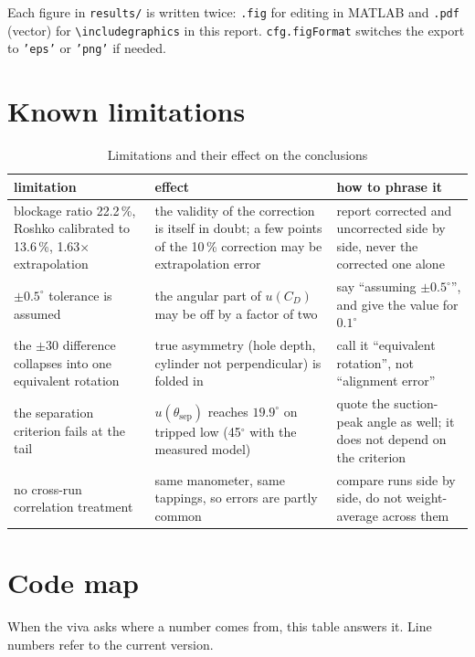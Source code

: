 \documentclass[11pt,a4paper]{article}
\newcommand{\CD}{\ensuremath{C_D}}
\begin{document}
Each figure in \texttt{results/} is written twice: \texttt{.fig} for editing in MATLAB and
\texttt{.pdf} (vector) for \texttt{\textbackslash includegraphics} in this report.
\texttt{cfg.figFormat} switches the export to \texttt{'eps'} or \texttt{'png'} if needed.

\section{Known limitations}

\begin{table}[H]
\centering
\caption{Limitations and their effect on the conclusions}
\small
\begin{tabularx}{\textwidth}{@{}p{4.0cm} X X@{}}
\toprule
limitation & effect & how to phrase it \\
\midrule
blockage ratio 22.2\,\%, Roshko calibrated to 13.6\,\%, 1.63$\times$ extrapolation &
the validity of the correction is itself in doubt; a few points of the 10\,\% correction may be extrapolation error &
report corrected and uncorrected side by side, never the corrected one alone \\
$\pm0.5^\circ$ tolerance is assumed &
the angular part of $u(\CD)$ may be off by a factor of two &
say ``assuming $\pm0.5^\circ$'', and give the value for $0.1^\circ$ \\
the $\pm30$ difference collapses into one equivalent rotation &
true asymmetry (hole depth, cylinder not perpendicular) is folded in &
call it ``equivalent rotation'', not ``alignment error'' \\
the separation criterion fails at the tail &
$u(\theta_{\text{sep}})$ reaches $19.9^\circ$ on tripped low (45$^\circ$ with the measured model) &
quote the suction-peak angle as well; it does not depend on the criterion \\
no cross-run correlation treatment &
same manometer, same tappings, so errors are partly common &
compare runs side by side, do not weight-average across them \\
\bottomrule
\end{tabularx}
\end{table}

\section{Code map}

When the viva asks where a number comes from, this table answers it. Line numbers refer to the
current version.
\end{document}
